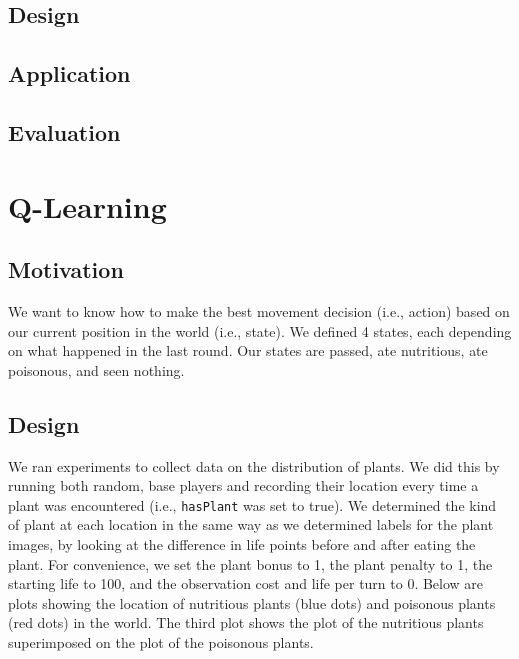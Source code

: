 \documentclass[solution, letterpaper]{cs121}
\begin{document}
\subsection{Design}
\subsection{Application}
\subsection{Evaluation}

\section{Q-Learning}
\subsection{Motivation}
We want to know how to make the best movement decision (i.e., action) based on our current position in the world (i.e., state). We defined 4 states, each depending on what happened in the last round. Our states are {\sc passed}, {\sc ate nutritious}, {\sc ate poisonous}, and {\sc seen nothing}.

\subsection{Design}
We ran experiments to collect data on the distribution of plants. We did this by running both random, base players and recording their location every time a plant was encountered (i.e., {\tt hasPlant} was set to true). We determined the kind of plant at each location in the same way as we determined labels for the plant images, by looking at the difference in life points before and after eating the plant. For convenience, we set the plant bonus to 1, the plant penalty to 1, the starting life to 100, and the observation cost and life per turn to 0. Below are plots showing the location of nutritious plants (blue dots) and poisonous plants (red dots) in the world. The third plot shows the plot of the nutritious plants superimposed on the plot of the poisonous plants.
\end{document}
